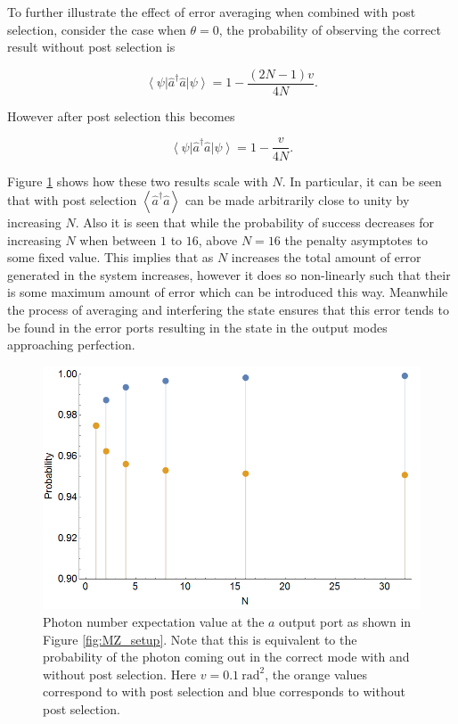 \documentclass[aps,pra,twocolumn,superscriptaddress,numerical]{revtex4-1}
\begin{document}
		To further illustrate the effect of error averaging when combined with post selection, consider the case when $\theta=0$, the probability of observing the correct result without post selection is
		
		\begin{equation}
			\left\langle \psi\right|\hat{a}^{\dagger}\hat{a}\left|\psi\right\rangle = 1 - \frac{(2N-1)v}{4N}. \label{eq:1pNoPost}
		\end{equation}
	
		However after post selection this becomes
		
		\begin{equation}
			\left\langle \psi\right|\hat{a}^{\dagger}\hat{a}\left|\psi\right\rangle = 1 - \frac{v}{4N}. \label{eq:1pWithPost}
		\end{equation}
		
		Figure \ref{fig:post vs no post} shows how these two results scale with $N$. In particular, it can be seen that with post selection $\left\langle \hat{a}^{\dagger}\hat{a}\right\rangle$ can be made arbitrarily close to unity by increasing $N$. Also it is seen that while the probability of success decreases for increasing $N$ when between $1$ to $16$, above $N=16$ the penalty asymptotes to some fixed value. This implies that as $N$ increases the total amount of error generated in the system increases, however it does so non-linearly such that their is some maximum amount of error which can be introduced this way. Meanwhile the process of averaging and interfering the state ensures that this error tends to be found in the error ports resulting in the state in the output modes approaching perfection.
		
		\begin{figure}
			\includegraphics[width=\columnwidth]{1photonpostvsnopost.png}
			\caption{\label{fig:post vs no post} Photon number expectation value at the $a$	output port as shown in Figure \ref{fig:MZ_setup}. Note that this is equivalent to the probability of the photon coming out in the correct mode with and without post selection. Here $v=0.1\ \textrm{rad}^{2}$, the orange values correspond to with post selection and blue corresponds to without post selection.}
		\end{figure}
\end{document}
